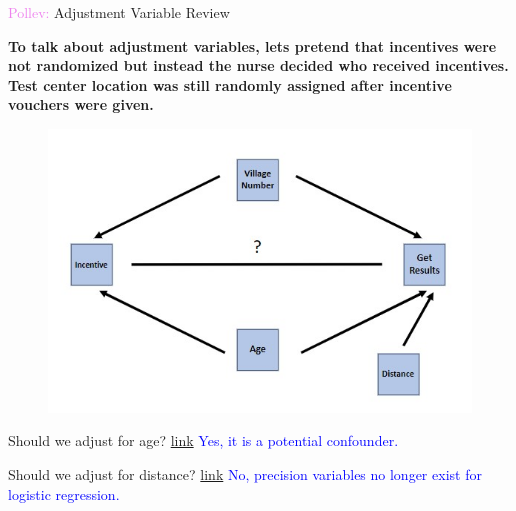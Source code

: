 \documentclass[10pt,t]{beamer}
\begin{document}
\begin{frame}{\textcolor{violet}{Pollev:} Adjustment Variable Review}
	
	\vspace{-5 mm}
	
	\textbf{To talk about adjustment variables, lets pretend that incentives were not randomized but instead the nurse decided who received incentives. Test center location was still randomly assigned after incentive vouchers were given.}
	
	
	\begin{figure}
		\centering
		\includegraphics[scale = 0.35]{./figs/HIV_dag}
	\end{figure}
	
	Should we adjust for age? \textcolor{purple}{\href{https://PollEv.com/multiple_choice_polls/lzWdMlCQVpYspRIGYrxZF/respond}{link}} \textcolor{blue}{Yes, it is a potential confounder.}
	
	\medskip
	
	Should we adjust for distance? \textcolor{purple}{\href{https://PollEv.com/multiple_choice_polls/G6ujbX4n8V7eSjwyNysEe/respond}{link}} \textcolor{blue}{No, precision variables no longer exist for logistic regression.}
	
\end{frame}

%	
%	 
\end{document}
